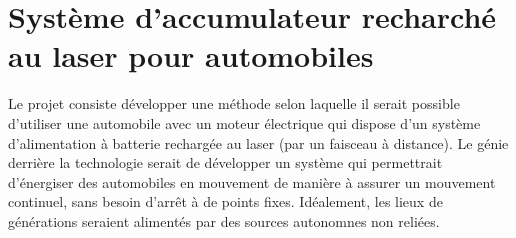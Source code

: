 \section{Système d'accumulateur recharché au laser pour automobiles}
Le projet consiste développer une méthode selon laquelle il serait possible d'utiliser une automobile avec un moteur électrique qui dispose d'un système d'alimentation à batterie rechargée au laser (par un faisceau à distance). Le génie derrière la technologie serait de développer un système qui permettrait d'énergiser des automobiles en mouvement de manière à assurer un mouvement continuel, sans besoin d'arrêt à de points fixes. Idéalement, les lieux de générations seraient alimentés par des sources autonomnes non reliées.   
